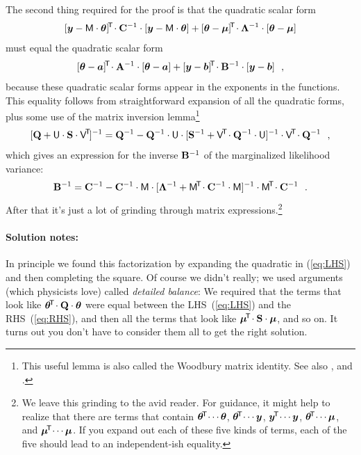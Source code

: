 The second thing required for the proof is that the quadratic scalar form
\begin{equation}\label{eq:LHS}
[\boldsymbol{y}-\mathsf{M}\cdot\boldsymbol{\theta}]^{\!\mathsf{T}\!}\cdot\mathbf{C}^{-1}\cdot[\boldsymbol{y}-\mathsf{M}\cdot\boldsymbol{\theta}]
+ [\boldsymbol{\theta}-\boldsymbol{\mu}]^{\!\mathsf{T}\!}\cdot\mathbf{\Lambda}^{-1}\cdot[\boldsymbol{\theta}-\boldsymbol{\mu}]
\end{equation}
must equal the quadratic scalar form
\begin{equation}\label{eq:RHS}
[\boldsymbol{\theta}-\boldsymbol{a}]^{\!\mathsf{T}\!}\cdot\mathbf{A}^{-1}\cdot[\boldsymbol{\theta}-\boldsymbol{a}]
+ [\boldsymbol{y}-\boldsymbol{b}]^{\!\mathsf{T}\!}\cdot\mathbf{B}^{-1}\cdot[\boldsymbol{y}-\boldsymbol{b}]
~~,
\end{equation}
because these quadratic scalar forms appear in the exponents in the functions.
This equality follows from straightforward expansion of
all the quadratic forms, plus some use of the matrix inversion lemma\footnote{This
  useful lemma is also called the Woodbury matrix identity. See also \cite{wiki:MIL},
  and \cite{Harville:2011}.}
\begin{equation}\label{eq:invlemma}
[\mathbf{Q} + \mathsf{U}\cdot\mathbf{S}\cdot\mathsf{V}^{\!\mathsf{T}\!}]^{-1} = \mathbf{Q}^{-1} - \mathbf{Q}^{-1}\cdot\mathsf{U}\cdot[\mathbf{S}^{-1} + \mathsf{V}^{\!\mathsf{T}\!}\cdot\mathbf{Q}^{-1}\cdot\mathsf{U}]^{-1}\cdot\mathsf{V}^{\!\mathsf{T}\!}\cdot\mathbf{Q}^{-1}
~~,
\end{equation}
which gives an expression for the inverse $\mathbf{B}^{-1}$ of the marginalized
likelihood variance:
\begin{equation}
\mathbf{B}^{-1} = \mathbf{C}^{-1} - \mathbf{C}^{-1}\cdot\mathsf{M}\cdot[\mathbf{\Lambda}^{-1} + \mathsf{M}^{\!\mathsf{T}\!}\cdot\mathbf{C}^{-1}\cdot\mathsf{M}]^{-1}\cdot\mathsf{M}^{\!\mathsf{T}\!}\cdot\mathbf{C}^{-1}
~~.
\end{equation}
After that it's just a lot of grinding through matrix expressions.\footnote{%
We leave this grinding to the avid reader.
For guidance, it might help to realize that there are terms that
contain $\boldsymbol{\theta}^{\!\mathsf{T}\!}\cdots\boldsymbol{\theta}$, $\boldsymbol{\theta}^{\!\mathsf{T}\!}\cdots\boldsymbol{y}$, $\boldsymbol{y}^{\!\mathsf{T}\!}\cdots\boldsymbol{y}$,
$\boldsymbol{\theta}^{\!\mathsf{T}\!}\cdots\boldsymbol{\mu}$, and $\boldsymbol{\mu}^{\!\mathsf{T}\!}\cdots\boldsymbol{\mu}$.
If you expand out each of these five kinds of terms, each of the five
should lead to an independent-ish equality.}

\paragraph{Solution notes:}
In principle we found this factorization by expanding the quadratic in
(\ref{eq:LHS}) and then completing the square.
Of course we didn't really; we used arguments (which physicists love)
called \emph{detailed balance}:
We required that the terms that look like
$\boldsymbol{\theta}^{\!\mathsf{T}\!}\cdot\mathbf{Q}\cdot\boldsymbol{\theta}$ were equal between the LHS~(\ref{eq:LHS})
and the RHS~(\ref{eq:RHS}), and then all the terms that look like
$\boldsymbol{\mu}^{\!\mathsf{T}\!}\cdot\mathbf{S}\cdot\boldsymbol{\mu}$, and so on.
It turns out you don't have to consider them all to get the right solution.

